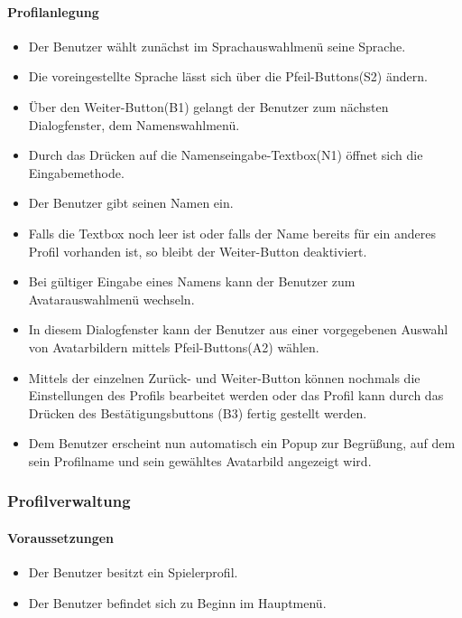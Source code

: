 \paragraph{Profilanlegung}
\begin{itemize}
	\item Der Benutzer wählt zunächst im Sprachauswahlmenü seine Sprache.
	\item Die voreingestellte Sprache lässt sich über die Pfeil-Buttons(S2) ändern.
	\item Über den Weiter-Button(B1) gelangt der Benutzer zum nächsten Dialogfenster, dem Namenswahlmenü.
	\item Durch das Drücken auf die Namenseingabe-Textbox(N1) öffnet sich die Eingabemethode.
	\item Der Benutzer gibt seinen Namen ein.
	\item Falls die Textbox noch leer ist oder falls der Name bereits für ein anderes Profil vorhanden ist, so bleibt der Weiter-Button deaktiviert.
	\item Bei gültiger Eingabe eines Namens kann der Benutzer zum Avatarauswahlmenü wechseln.
	\item In diesem Dialogfenster kann der Benutzer aus einer vorgegebenen Auswahl von Avatarbildern mittels Pfeil-Buttons(A2) wählen.
	\item Mittels der einzelnen Zurück- und Weiter-Button können nochmals die Einstellungen des Profils bearbeitet werden oder das Profil kann durch das Drücken des Bestätigungsbuttons (B3) fertig gestellt werden.
	\item Dem Benutzer erscheint nun automatisch ein Popup zur Begrüßung, auf dem sein Profilname und sein gewähltes Avatarbild angezeigt wird.
\end{itemize}

\subsubsection{Profilverwaltung}
\paragraph{Voraussetzungen}
\begin{itemize}
	\item Der Benutzer besitzt ein Spielerprofil.
	\item Der Benutzer befindet sich zu Beginn im Hauptmenü.
\end{itemize}
